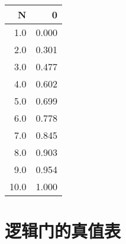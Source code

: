 \begin{center}
  \begin{tabular}[t]{|r|r|}
    \hline
    \multicolumn{1}{|r|}{\textbf{N}} & \multicolumn{1}{|r|}{\textbf{0}} \\
    \hline
    \num{1.0}                        & \num{.000}                       \\ \hline
    \num{2.0}                        & \num{.301}                       \\ \hline
    \num{3.0}                        & \num{.477}                       \\ \hline
    \num{4.0}                        & \num{.602}                       \\ \hline
    \num{5.0}                        & \num{.699}                       \\ \hline
    \num{6.0}                        & \num{.778}                       \\ \hline
    \num{7.0}                        & \num{.845}                       \\ \hline
    \num{8.0}                        & \num{.903}                       \\ \hline
    \num{9.0}                        & \num{.954}                       \\ \hline
    \num{10.0}                       & \num{1.000}                      \\ \hline
  \end{tabular}
\end{center}

\newpage

\section{逻辑门的真值表}

